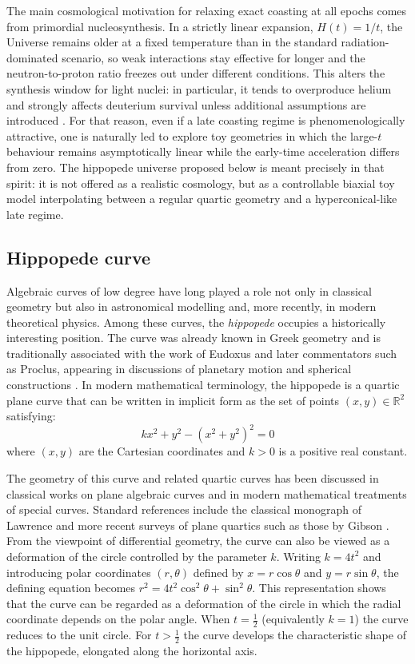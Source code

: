 \documentclass[3p,times,twocolumn]{elsarticle}
\begin{document}
The main cosmological motivation for relaxing exact coasting at all epochs comes from primordial nucleosynthesis. In a strictly linear expansion, $H(t)=1/t$, the Universe remains older at a fixed temperature than in the standard radiation-dominated scenario, so weak interactions stay effective for longer and the neutron-to-proton ratio freezes out under different conditions. This alters the synthesis window for light nuclei: in particular, it tends to overproduce helium and strongly affects deuterium survival unless additional assumptions are introduced \cite{sethi1999coasting, dev2002coasting}. For that reason, even if a late coasting regime is phenomenologically attractive, one is naturally led to explore toy geometries in which the large-$t$ behaviour remains asymptotically linear while the early-time acceleration differs from zero. The hippopede universe proposed below is meant precisely in that spirit: it is not offered as a realistic cosmology, but as a controllable biaxial toy model interpolating between a regular quartic geometry and a hyperconical-like late regime.

\subsection{Hippopede curve}
Algebraic curves of low degree have long played a role not only in classical geometry but also in astronomical modelling and, more recently, in modern theoretical physics. Among these curves, the \emph{hippopede} occupies a historically interesting position. The curve was already known in Greek geometry and is traditionally associated with the work of Eudoxus and later commentators such as Proclus, appearing in discussions of planetary motion and spherical constructions \cite{Gregory_2011, Taub2020, BotteriCasazza2023}. In modern mathematical terminology, the hippopede is a quartic plane curve that can be written in implicit form as the set of points $(x,y) \in \mathbb{R}^2$ satisfying:
\begin{equation}
    k x^2 + y^2 - (x^2+y^2)^2 = 0
\end{equation}
where $(x,y)$ are the Cartesian coordinates and $k > 0$ is a positive real constant.


The geometry of this curve and related quartic curves has been discussed in classical works on plane algebraic curves and in modern mathematical treatments of special curves. Standard references include the classical monograph of Lawrence \cite{lawrence1972catalogue} and more recent surveys of plane quartics such as those by Gibson \cite{gibson2001elementary}. From the viewpoint of differential geometry, the curve can also be viewed as a deformation of the circle controlled by the parameter $k$. Writing $k=4t^2$ and introducing polar coordinates $(r,\theta)$ defined by $x=r\cos\theta$ and $y=r\sin\theta$, the defining equation becomes $r^2 = 4t^2\cos^2\theta + \sin^2\theta$. This representation shows that the curve can be regarded as a deformation of the circle in which the radial coordinate depends on the polar angle. When $t=\tfrac12$ (equivalently $k=1$) the curve reduces to the unit circle. For $t >\tfrac12$ the curve develops the characteristic shape of the hippopede, elongated along the horizontal axis.
\end{document}

